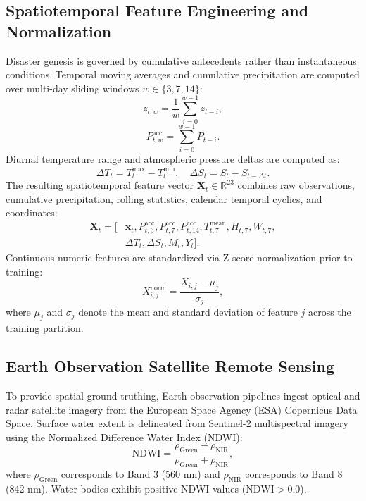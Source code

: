 \documentclass[conference]{IEEEtran}
\begin{document}
\subsection{Spatiotemporal Feature Engineering and Normalization}
Disaster genesis is governed by cumulative antecedents rather than instantaneous conditions. Temporal moving averages and cumulative precipitation are computed over multi-day sliding windows $w \in \{3, 7, 14\}$:
\begin{equation}
z_{t,w} = \frac{1}{w} \sum_{i=0}^{w-1} z_{t-i},
\label{eq:moving_avg}
\end{equation}
\begin{equation}
P^{\text{acc}}_{t,w} = \sum_{i=0}^{w-1} P_{t-i}.
\label{eq:precip_acc}
\end{equation}
Diurnal temperature range and atmospheric pressure deltas are computed as:
\begin{equation}
\Delta T_t = T^{\text{max}}_t - T^{\text{min}}_t, \quad \Delta S_t = S_t - S_{t-\Delta t}.
\label{eq:deltas}
\end{equation}
The resulting spatiotemporal feature vector $\mathbf{X}_t \in \mathbb{R}^{23}$ combines raw observations, cumulative precipitation, rolling statistics, calendar temporal cyclics, and coordinates:
\begin{equation}
\begin{aligned}
\mathbf{X}_t = \big[ &\mathbf{x}_t, P^{\text{acc}}_{t,3}, P^{\text{acc}}_{t,7}, P^{\text{acc}}_{t,14}, T^{\text{mean}}_{t,7}, H_{t,7}, W_{t,7}, \\
&\Delta T_t, \Delta S_t, M_t, Y_t \big].
\end{aligned}
\label{eq:feature_vector}
\end{equation}
Continuous numeric features are standardized via Z-score normalization prior to training:
\begin{equation}
X^{\text{norm}}_{i,j} = \frac{X_{i,j} - \mu_j}{\sigma_j},
\label{eq:zscore}
\end{equation}
where $\mu_j$ and $\sigma_j$ denote the mean and standard deviation of feature $j$ across the training partition.

\subsection{Earth Observation Satellite Remote Sensing}
To provide spatial ground-truthing, Earth observation pipelines ingest optical and radar satellite imagery from the European Space Agency (ESA) Copernicus Data Space.
Surface water extent is delineated from Sentinel-2 multispectral imagery using the Normalized Difference Water Index (NDWI):
\begin{equation}
\text{NDWI} = \frac{\rho_{\text{Green}} - \rho_{\text{NIR}}}{\rho_{\text{Green}} + \rho_{\text{NIR}}},
\label{eq:ndwi}
\end{equation}
where $\rho_{\text{Green}}$ corresponds to Band 3 (560 nm) and $\rho_{\text{NIR}}$ corresponds to Band 8 (842 nm). Water bodies exhibit positive NDWI values ($\text{NDWI} > 0.0$).
\end{document}
